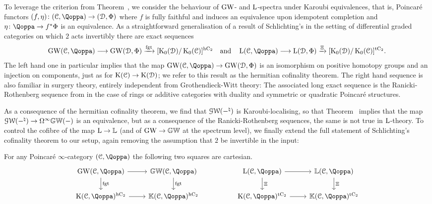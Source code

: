 To leverage the criterion from Theorem~, we consider the behaviour of $\operatorname{GW}$- and $\operatorname L$-spectra under Karoubi equivalences, that is, Poincar\'e functors $(f,\eta) \colon (\C,\QF) \rightarrow (\D,\QFD)$ where $f$ is fully faithful and induces an equivalence upon idempotent completion and $\eta\colon \QF \to f^*\QFD$ is an equivalence. 
As a straightforward generalisation of a result of Schlichting's in the setting of differential graded categories on which $2$ acts invertibly \cite{schlichting-derived} there are
exact sequences
\[
\GW(\C,\QF)\longrightarrow \GW(\D,\QFD) \xrightarrow{\fgt} [\K_0(\D)/\K_0(\C)]^\hC \quad \text{and} \quad \L(\C,\QF)\longrightarrow \L(\D,\QFD) \xrightarrow{\Xi} [\K_0(\D)/\K_0(\C)]^\tC.
\]
The left hand one in particular implies that the map $\GW(\C,\QF) \rightarrow \GW(\D,\QFD)$ is an isomorphism on positive homotopy groups and an injection on components, just as for $\operatorname K(\mathcal C) \rightarrow \operatorname K(\mathcal{D})$; we refer to this result as the hermitian cofinality theorem. The right hand sequence is also familiar in surgery theory, entirely independent from Grothendieck-Witt theory: The associated long exact sequence is the Ranicki-Rothenberg sequence from \cite{Ranicki-lower} in the case of rings or additive categories with duality and symmetric or quadratic Poincar\'e structures.

As a consequence of the hermitian cofinality theorem, we find that $\operatorname{\mathcal{GW}}(-^\natural)$ is Karoubi-localising, so that Theorem~ implies that the map $\operatorname{\mathcal{GW}}(-^\natural) \to \Omega^\infty\mathbb{GW}(-)$ is an equivalence, but as a consequence of the Ranicki-Rothenberg sequences, the same is not true in $\operatorname L$-theory. To control the cofibre of the map $\operatorname L \to \mathbb{L}$ (and of $\operatorname{GW} \rightarrow \mathbb{GW}$ at the spectrum level), we finally extend the full statement of Schlichting's cofinality theorem \cite{schlichting-derived} to our setup, again removing the assumption that $2$ be invertible in the input:






\begin{propositionintrofour}
\label{proposition:intro-D}%
For any Poincaré $\infty$-category $(\C,\QF)$ the following two squares are cartesian.
\[
\begin{tikzcd}
\GW(\C,\QF) \ar[r] \ar[d,"\fgt"] & \KGW(\C,\QF) \ar[d,"\fgt"] && \L(\C,\QF) \ar[r] \ar[d,"\Xi"] & \KL(\C,\QF) \ar[d,"\Xi"]\\
\K(\C,\QF)^\hC \ar[r] & \KK(\C,\QF)^\hC &&\K(\C,\QF)^\tC \ar[r] & \KK(\C,\QF)^\tC
\end{tikzcd}
\]
\end{propositionintrofour}

